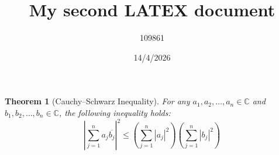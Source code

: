 \documentclass[12pt, a4paper, oneside]{ctexart}
\title{My second LATEX document}
\author{109861}
\date{14/4/2026}
\newtheorem{theorem}{Theorem}[section]
\begin{document}
\maketitle

\setcounter{section}{6}
\setcounter{theorem}{4} 

\begin{theorem}[Cauchy--Schwarz Inequality]
For any $a_1, a_2, \ldots, a_n \in \mathbb{C}$ and $b_1, b_2, \ldots, b_n \in \mathbb{C}$, the following inequality holds:
\[
\left| \sum_{j=1}^{n} a_j \overline{b_j} \right|^2 \leq \left( \sum_{j=1}^{n} |a_j|^2 \right) \left( \sum_{j=1}^{n} |b_j|^2 \right)
\]
\end{theorem}
\end{document}
